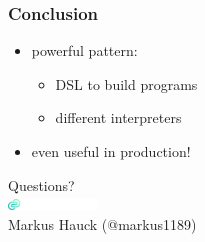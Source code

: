 \documentclass{beamer}
\begin{document}
\begin{frame}
  \frametitle{Conclusion}
  \begin{itemize}
  \item powerful pattern:
    \begin{itemize}
    \item DSL to build programs
    \item different interpreters
    \end{itemize}
  \item even useful in production!
  \end{itemize}
\end{frame}

{
  \begin{frame}
    \begin{center}
      \vspace{1cm}
      {\Huge
        Questions?} \\
      \vspace{1cm}
      \includegraphics[height=3mm]{pics/codecentric-logo} \\
      \vspace{1cm}
      Markus Hauck (@markus1189)
    \end{center}

  \end{frame}
}
\end{document}
